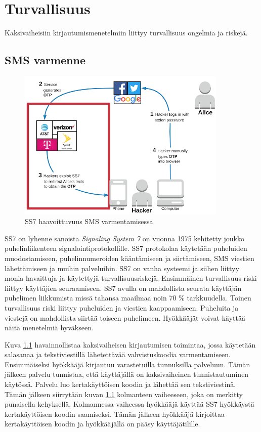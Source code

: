 \chapter{Turvallisuus\label{Turvallisuus}}

Kaksivaiheisiin kirjautumismenetelmiin liittyy turvallisuus ongelmia ja riskejä. 

\section{SMS varmenne}
\begin{figure}[ht]
    \centering
    \includegraphics[width=10cm]{template/figures/SS7 attack vulnerable.png}
    \caption{SS7 haavoittuvuus SMS varmentamisessa \citep{2FA_SMS}}
    \label{fig:ss7SMSM}
\end{figure}

SS7 on lyhenne sanoista \emph{Signaling System 7} on vuonna 1975 kehitetty joukko puhelinliikenteen signalointiprotokollille. SS7 protokolaa käytetään puheluiden muodostamiseen, puhelinnumeroiden kääntämiseen ja siirtämiseen, SMS viestien lähettämiseen ja muihin palveluihin. SS7 on vanha systeemi ja siihen liittyy monia havaittuja ja käytettyjä turvallisuusriskejä. Ensimmäinen turvallisuus riski liittyy käyttäjien seuraamiseen. SS7 avulla on mahdollista seurata käyttäjän puhelimen liikkumista missä tahansa maailmaa noin 70 \% tarkkuudella. Toinen turvallisuus riski liittyy puheluiden ja viestien kaappaamiseen. Puheluita ja viestejä on mahdollista siirtää toiseen puhelimeen. Hyökkääjät voivat käyttää näitä menetelmiä hyväkseen. \citep{ss7}

Kuva \ref{fig:ss7SMSM} havainnollistaa kaksivaiheisen kirjautumisen toimintaa, jossa käytetään salasanaa ja tekstiviestillä lähetettävää vahvistuskoodia varmentamiseen. Ensimmäiseksi hyökkääjä kirjautuu varastetuilla tunnuksilla palveluun. Tämän jälkeen palvelu tunnistaa, että käyttäjällä on kaksivaiheinen tunnistautuminen käytössä. Palvelu luo kertakäyttöisen koodin ja lähettää sen tekstiviestinä. Tämän jälkeen siirrytään kuvan \ref{fig:ss7SMSM}  kolmanteen vaiheeseen, joka on merkitty punaisella kehyksellä. Kolmannessa vaiheessa hyökkääjä käyttää SS7 hyökkäystä kertakäyttöisen koodin saamiseksi. Tämän jälkeen hyökkääjä kirjoittaa kertakäyttöisen koodin ja hyökkääjällä on pääsy käyttäjätilille.


